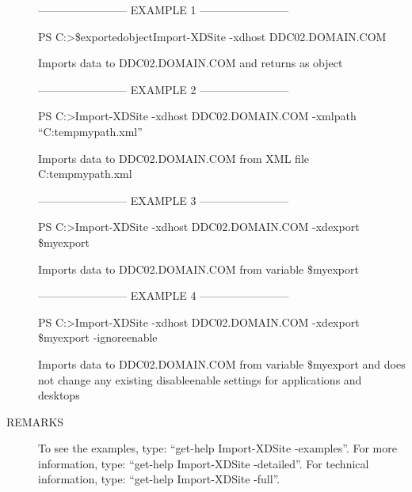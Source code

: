 \documentclass[letterpaper,10pt,english]{sphinxmanual}
\begin{document}
\begin{description}
\begin{description}
\end{description}

————————\textendash{} EXAMPLE 1 ————————\textendash{}

PS C:\textgreater{}\$exportedobject\textbar{}Import-XDSite -xdhost DDC02.DOMAIN.COM

Imports data to DDC02.DOMAIN.COM and returns as object

————————\textendash{} EXAMPLE 2 ————————\textendash{}

PS C:\textgreater{}Import-XDSite -xdhost DDC02.DOMAIN.COM -xmlpath “C:tempmypath.xml”

Imports data to DDC02.DOMAIN.COM from XML file C:tempmypath.xml

————————\textendash{} EXAMPLE 3 ————————\textendash{}

PS C:\textgreater{}Import-XDSite -xdhost DDC02.DOMAIN.COM -xdexport \$myexport

Imports data to DDC02.DOMAIN.COM from variable \$myexport

————————\textendash{} EXAMPLE 4 ————————\textendash{}

PS C:\textgreater{}Import-XDSite -xdhost DDC02.DOMAIN.COM -xdexport \$myexport -ignoreenable

Imports data to DDC02.DOMAIN.COM from variable \$myexport and does not change any existing disableenable settings for applications and desktops

\item[{REMARKS}] \leavevmode
To see the examples, type: “get-help Import-XDSite -examples”.
For more information, type: “get-help Import-XDSite -detailed”.
For technical information, type: “get-help Import-XDSite -full”.

\end{description}
\end{document}
